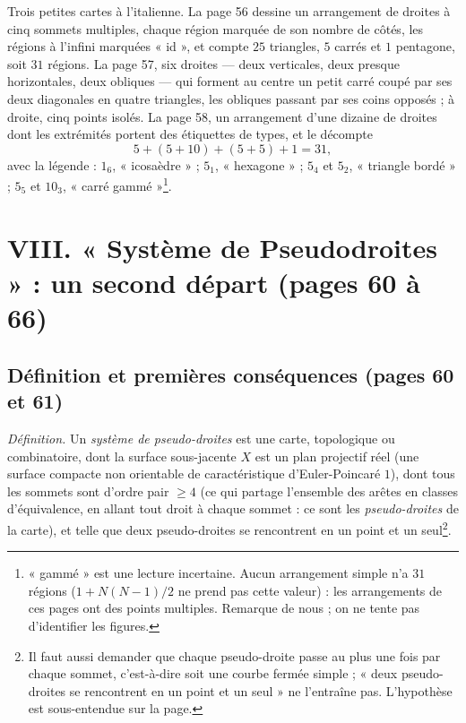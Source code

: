\documentclass[11pt,a4paper]{article}
\begin{document}
Trois petites cartes à l'italienne. La page 56 dessine un arrangement de
droites à cinq sommets multiples, chaque région marquée de son nombre de
côtés, les régions à l'infini marquées « id », et compte $25$ triangles, $5$
carrés et $1$ pentagone, soit $31$ régions. La page 57, six droites --- deux verticales, deux presque
horizontales, deux obliques --- qui forment au centre un petit carré coupé
par ses deux diagonales en quatre triangles, les obliques passant par ses
coins opposés ; à droite, cinq points isolés. La page 58, un
arrangement d'une dizaine de droites dont les extrémités portent des
étiquettes de types, et le décompte
\[
5 + (5 + 10) + (5 + 5) + 1 = 31,
\]
avec la légende : $1_6$, « icosaèdre » ; $5_1$, « hexagone » ; $5_4$ et
$5_2$, « triangle bordé » ; $5_5$ et $10_3$, « carré
gammé »\footnote{« gammé » est une lecture incertaine. Aucun arrangement
simple n'a $31$ régions ($1 + N(N-1)/2$ ne prend pas cette valeur) : les
arrangements de ces pages ont des points multiples. Remarque de nous ; on ne
tente pas d'identifier les figures.}.

\section*{VIII. « Système de Pseudodroites » : un second départ (pages 60 à 66)}

\subsection*{Définition et premières conséquences (pages 60 et 61)}

\emph{Définition.} Un \emph{système de pseudo-droites} est une carte,
topologique ou combinatoire, dont la surface sous-jacente $X$ est un plan
projectif réel (une surface compacte non orientable de caractéristique
d'Euler-Poincaré $1$), dont tous les sommets sont d'ordre pair $\geqslant 4$
(ce qui partage l'ensemble des arêtes en classes d'équivalence, en allant
tout droit à chaque sommet : ce sont les \emph{pseudo-droites} de la carte),
et telle que deux pseudo-droites se rencontrent en un point et un
seul\footnote{Il faut aussi demander que chaque pseudo-droite passe au plus
une fois par chaque sommet, c'est-à-dire soit une courbe fermée simple ;
« deux pseudo-droites se rencontrent en un point et un seul » ne l'entraîne
pas. L'hypothèse est sous-entendue sur la page.}.
\end{document}
